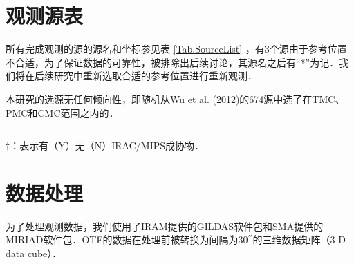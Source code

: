 \documentclass[UTF8, nocolorlinks]{pkuthss}
\newcommand{\arcsec}{$^{\prime\prime}$}
\begin{document}
    \section{观测源表}
        所有完成观测的源的源名和坐标参见表 \ref{Tab.SourceList} ，有3个源由于参考位置不合适，为了保证数据的可靠性，被排除出后续讨论，其源名之后有“*”为记．我们将在后续研究中重新选取合适的参考位置进行重新观测．

        本研究的选源无任何倾向性，即随机从Wu et al. (2012)的674源中选了在TMC、PMC和CMC范围之内的\supercite{wu2012gas}．

        \label{Tab.SourceList}
			\begin{footnotesize}
			\begin{center}
			\setlength{\tabcolsep}{0.04in}
			\tablelasttail{\hline\bottomrule}
			\begin{supertabular}{lllcccclr}
			
			\end{supertabular}		
			\end{center}
			$\dagger$：表示有（Y）无（N）IRAC/MIPS成协物．
			\end{footnotesize}

	\section{数据处理}
        为了处理观测数据，我们使用了IRAM提供的GILDAS软件包\supercite{2000ASPC..217..299G}和SMA提供的MIRIAD软件包\supercite{1995ASPC...77..433S}．OTF的数据在处理前被转换为间隔为30\arcsec 的三维数据矩阵（3-D data cube）．
\end{document}

